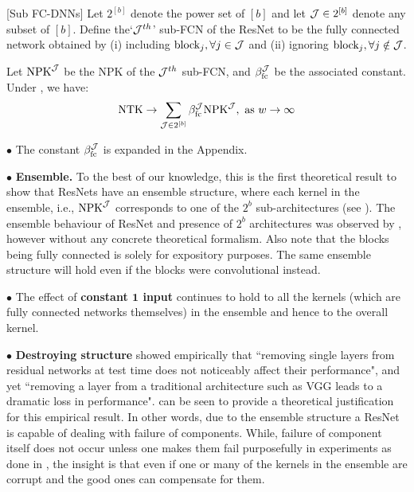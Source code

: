 \begin{definition}\label{def:subfcdnn}[Sub FC-DNNs]
Let $2^{[b]}$ denote the power set of $[b]$ and let $\mathcal{J}\in 2^{[b]}$ denote any subset of $[b]$. Define the`$\mathcal{J}^{th}$' sub-FCN of the ResNet to be the fully connected network obtained by (i) including  $\text{block}_{j},\forall j\in \mathcal{J}$  and (ii) ignoring $\text{block}_{j},\forall j\notin \mathcal{J}$. %
\end{definition}
\begin{theorem}
\label{th:res} Let $\text{NPK}^{\mathcal{J}}$ be the NPK of the $\mathcal{J}^{th}$ sub-FCN, and $\beta_{\text{fc}}^{\mathcal{J}}$ be the associated constant. Under , we have:
\begin{align*}
\text{NTK}\rightarrow \sum_{\mathcal{J}\in 2^{[b]}}  \beta_{\text{fc}}^{\mathcal{J}} \text{NPK}^{\mathcal{J}}, \,\, \text{as}\,\,  w\rightarrow\infty
\end{align*}
\end{theorem}

$\bullet$ The constant $\beta_{\text{fc}}^{\mathcal{J}}$ is expanded in the Appendix. 

$\bullet$ \textbf{Ensemble.} To the best of our knowledge, this is the first theoretical result to show that ResNets have an ensemble structure, where  each kernel in the ensemble, i.e., $\text{NPK}^{\mathcal{J}}$ corresponds to one of the $2^b$ sub-architectures (see ). The ensemble behaviour of ResNet and  presence of $2^b$ architectures was observed by \cite{veit2016residual}, however without any concrete theoretical formalism. Also note that the blocks being fully connected is solely for expository purposes. The same ensemble structure will hold even if the blocks were convolutional instead.

$\bullet$ The effect of \textbf{constant $\mathbf{1}$ input} continues to hold to all the kernels (which are fully connected networks themselves) in the ensemble and hence to the overall kernel.

$\bullet$ \textbf{Destroying structure} \cite{veit2016residual} showed empirically that ``removing single layers from residual networks at test time does not noticeably affect their performance", and yet ``removing a layer from a traditional architecture such as VGG leads to a dramatic loss in performance".  can be seen to provide a theoretical justification for this empirical result. In other words, due to the ensemble structure a ResNet is capable of dealing with failure of components. While, failure of component itself does not occur unless one makes them fail purposefully in experiments as done in \citep{veit2016residual},  the insight is that even if one or many of the kernels in the ensemble are corrupt and the good ones can compensate for them. 

